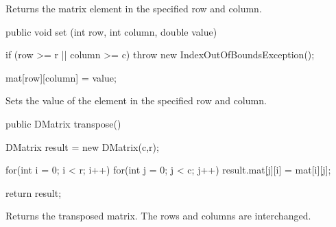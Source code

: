 \begin{tabb} Returns the matrix element in the specified row and column.
\end{tabb}
\begin{htmlonly}
\end{htmlonly}
\begin{code}

   public void set (int row, int column, double value) \begin{hide} {
      if (row >= r || column >= c)
         throw new IndexOutOfBoundsException();

      mat[row][column] = value;
   } \end{hide}
\end{code}
\begin{tabb} Sets the value of the element in the specified row and column.
\end{tabb}
\begin{htmlonly}
\end{htmlonly}
\begin{code}

   public DMatrix transpose() \begin{hide} {
      DMatrix result = new DMatrix(c,r);

      for(int i = 0; i < r; i++)
         for(int j = 0; j < c; j++)
            result.mat[j][i] = mat[i][j];

      return result;
   } \end{hide}
\end{code}
\begin{tabb} Returns the transposed matrix. The rows and columns are
  interchanged.
\end{tabb}
\begin{htmlonly}
\end{htmlonly}

\begin{code}
\begin{hide}
}
\end{hide}
\end{code}

